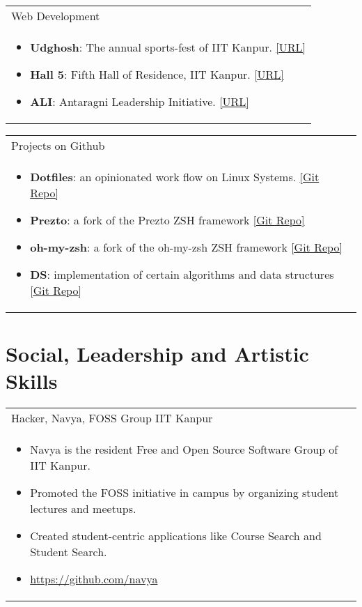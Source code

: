 \documentclass[a4paper,10pt]{article} %
\newcommand{\projectlist}[2]{
    \begin{tabular}{p{\linewidth}}
        \textcolor{NavyBlue}{#1}\\
        \vspace{-0.3cm}
        \footnotesize{#2}
    \end{tabular}
    \vspace{-0.4cm}
}
\begin{document}
\projectlist {Web Development}
             {
                 \begin{itemize}[leftmargin=0.5cm]
                     \item \textbf{Udghosh}: The annual sports-fest of IIT Kanpur.
                         \href{www.udghosh.org} {[URL]}
                     \item \textbf{Hall 5}: Fifth Hall of Residence, IIT Kanpur.
                         \href{http://www.iitk.ac.in/hall5} {[URL]}
                     \item \textbf{ALI}: Antaragni Leadership Initiative.
                         \href{www.antargni.in/ali} {[URL]}
                 \end{itemize}
             }

\projectlist {Projects on Github}
             {
                 \begin{itemize}[leftmargin=0.5cm]
                     \item \textbf{Dotfiles}: an opinionated work flow on Linux Systems.
                         \href{https://github.com/srijanshetty/dotfiles} {[Git Repo]}
                     \item \textbf{Prezto}: a fork of the Prezto ZSH framework
                         \href{https://github.com/srijanshetty/prezto} {[Git Repo]}
                     \item \textbf{oh-my-zsh}: a fork of the oh-my-zsh ZSH framework
                         \href{https://github.com/srijanshetty/oh-my-zsh} {[Git Repo]}
                     \item \textbf{DS}: implementation of certain algorithms and data structures
                         \href{https://github.com/srijanshetty/DS} {[Git Repo]}
                 \end{itemize}
             }



\section {Social, Leadership and Artistic Skills}

\projectlist {Hacker, Navya, FOSS Group IIT Kanpur}
             {
                   \begin{itemize}[leftmargin=0.5cm]
                       \item Navya is the resident Free and Open Source Software Group of IIT Kanpur.
                       \item Promoted the FOSS initiative in campus by organizing student lectures and meetups.
                       \item Created student-centric applications like Course Search and Student Search.
                       \item \href{https://github.com/navya} {https://github.com/navya}
                   \end{itemize}
             }
\end{document}
